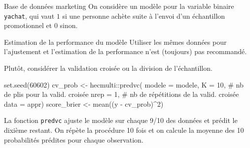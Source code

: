 \documentclass[
  ignorenonframetext,
]{beamer}
\newenvironment{Shaded}{\begin{snugshade}}{\end{snugshade}}
\newcommand{\AttributeTok}[1]{\textcolor[rgb]{0.40,0.45,0.13}{#1}}
\newcommand{\CommentTok}[1]{\textcolor[rgb]{0.37,0.37,0.37}{#1}}
\newcommand{\DecValTok}[1]{\textcolor[rgb]{0.68,0.00,0.00}{#1}}
\newcommand{\FunctionTok}[1]{\textcolor[rgb]{0.28,0.35,0.67}{#1}}
\newcommand{\NormalTok}[1]{\textcolor[rgb]{0.00,0.23,0.31}{#1}}
\newcommand{\OtherTok}[1]{\textcolor[rgb]{0.00,0.23,0.31}{#1}}
\newcommand{\SpecialCharTok}[1]{\textcolor[rgb]{0.37,0.37,0.37}{#1}}
\newcommand{\StringTok}[1]{\textcolor[rgb]{0.13,0.47,0.30}{#1}}
\begin{document}
\begin{frame}[fragile]{Base de données marketing}
\label{base-de-donnuxe9es-marketing}
On considère un modèle pour la variable binaire \texttt{yachat}, qui
vaut \(1\) si une personne achète suite à l'envoi d'un échantillon
promotionnel et \(0\) sinon.

\begin{Shaded}
\end{Shaded}
\end{frame}

\begin{frame}[fragile]{Estimation de la performance du modèle}
\label{estimation-de-la-performance-du-moduxe8le}
Utiliser les mêmes données pour l'ajustement et l'estimation de la
performance n'est (toujours) pas recommandé.

Plutôt, considérer la validation croisée ou la division de
l'échantillon.

\begin{Shaded}
\begin{Highlighting}[numbers=left,,]
\FunctionTok{set.seed}\NormalTok{(}\DecValTok{60602}\NormalTok{)}
\NormalTok{cv\_prob }\OtherTok{\textless{}{-}}\NormalTok{ hecmulti}\SpecialCharTok{::}\FunctionTok{predvc}\NormalTok{(}
  \AttributeTok{modele =}\NormalTok{ modele,  }
  \AttributeTok{K =} \DecValTok{10}\NormalTok{, }\CommentTok{\# nb de plis pour la valid. croisée}
  \AttributeTok{nrep =} \DecValTok{1}\NormalTok{, }\CommentTok{\# nb de répétitions de la valid. croisée}
  \AttributeTok{data =}\NormalTok{ appr)}
\NormalTok{score\_brier }\OtherTok{\textless{}{-}} \FunctionTok{mean}\NormalTok{((y }\SpecialCharTok{{-}}\NormalTok{ cv\_prob)}\SpecialCharTok{\^{}}\DecValTok{2}\NormalTok{)}
\end{Highlighting}
\end{Shaded}

\footnotesize

La fonction \texttt{predvc} ajuste le modèle sur chaque 9/10 des données
et prédit le dixième restant. On répète la procédure 10 fois et on
calcule la moyenne des 10 probabilités prédites pour chaque observation.

\normalsize
\end{frame}
\end{document}
